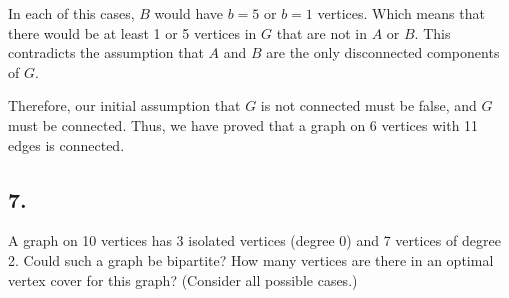 \documentclass[a4paper]{article}
\begin{document}
\par In each of this cases, \(B\) would have \(b=5\) or \(b=1\) vertices. Which means that there would be at least 1 or 5 vertices in \(G\) that are not in \(A\) or \(B\). This contradicts the assumption that \(A\) and \(B\) are the only disconnected components of \(G\).\\ 
\par Therefore, our initial assumption that \(G\) is not connected must be false, and \(G\) must be connected. Thus, we have proved that a graph on 6 vertices with 11 edges is connected.

\subsection*{7.} A graph on 10 vertices has 3 isolated vertices (degree 0) and 7 vertices of degree 2. Could such a graph be bipartite? How many vertices are there in an optimal vertex cover for this graph? (Consider all possible cases.)
\end{document}
